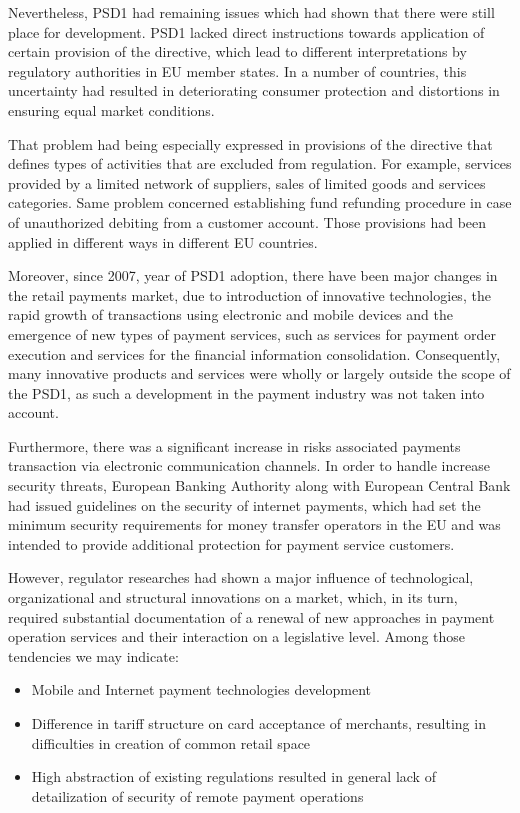 Nevertheless, PSD1 had remaining issues which had shown that there were still place for development.
PSD1 lacked direct instructions towards application of certain provision of the directive, which lead to different interpretations by regulatory authorities in EU member states.
In a number of countries, this uncertainty had resulted in deteriorating consumer protection and distortions in ensuring equal market conditions. 

That problem had being especially expressed in provisions of the directive that defines types of activities that are excluded from regulation. 
For example, services provided by a limited network of suppliers, sales of limited goods and services categories.
Same problem concerned establishing fund refunding procedure in case of unauthorized debiting from a customer account.
Those provisions had been applied in different ways in different EU countries. 

Moreover, since 2007, year of PSD1 adoption, there have been major changes in the retail payments market, due to introduction of innovative technologies, the rapid growth of transactions using electronic and mobile devices and the emergence of new types of payment services, such as services for payment order execution and services for the financial information consolidation. 
Consequently, many innovative products and services were wholly or largely outside the scope of the PSD1, as such a development in the payment industry was not taken into account.

Furthermore, there was a significant increase in risks associated payments transaction via electronic communication channels.
In order to handle increase security threats, European Banking Authority along with European Central Bank had issued guidelines on the security of internet payments, which had set the minimum security requirements for money transfer operators in the EU and was intended to provide additional protection for payment service customers. 
\cite{guidelines_internet_payments}

However, regulator researches had shown a major influence of technological, organizational and structural innovations on a market, which, in its turn, required substantial documentation of a renewal of new approaches in payment operation services and their interaction on a legislative level.
Among those tendencies we may indicate:
\begin{itemize}
    \item Mobile and Internet payment technologies development
    \item Difference in tariff structure on card acceptance of merchants, resulting in difficulties in creation of common retail space
    \item High abstraction of existing regulations resulted in general lack of detailization of security of remote payment operations
\end{itemize}


